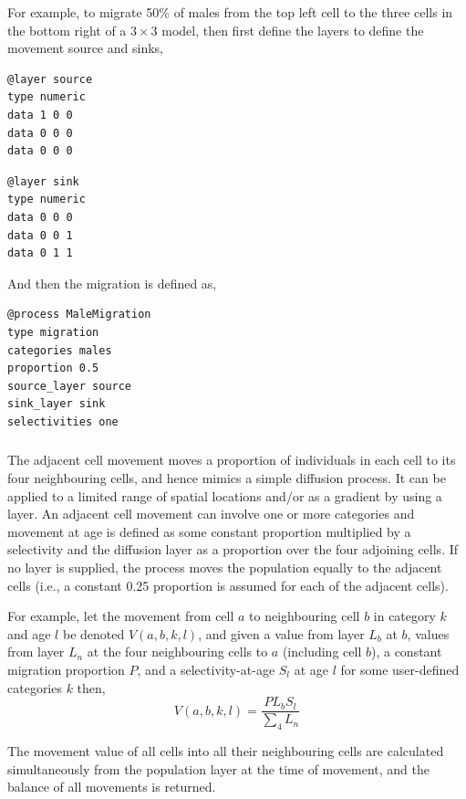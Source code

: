 For example, to migrate 50\% of males from the top left cell to the three cells in the bottom right of a $3\times3$ model, then first define the layers to define the movement source and sinks, 

{\small{\begin{verbatim}
@layer source
type numeric
data 1 0 0
data 0 0 0
data 0 0 0
\end{verbatim}}}

{\small{\begin{verbatim}
@layer sink
type numeric
data 0 0 0
data 0 0 1
data 0 1 1
\end{verbatim}}}

And then the migration is defined as,

{\small{\begin{verbatim}
@process MaleMigration
type migration
categories males
proportion 0.5
source_layer source
sink_layer sink
selectivities one
\end{verbatim}}}

\subsubsection{}

The adjacent cell movement moves a proportion of individuals in each cell to its four neighbouring cells, and hence mimics a simple diffusion process. It can be applied to a limited range of spatial locations and/or as a gradient by using a layer. An adjacent cell movement can involve one or more categories and movement at age is defined as some constant proportion multiplied by a selectivity and the diffusion layer as a proportion over the four adjoining cells. If no layer is supplied, the process moves the population equally to the adjacent cells (i.e., a constant 0.25 proportion is assumed for each of the adjacent cells).

For example, let the movement from cell $a$ to neighbouring cell $b$ in category $k$ and age $l$ be denoted $V(a,b,k,l)$, and given a value from layer $L_b$  at $b$, values from layer $L_n$ at the four neighbouring cells to $a$ (including cell $b$), a constant migration proportion $P$, and a selectivity-at-age $S_l$ at age $l$ for some user-defined categories $k$ then, 
\begin{equation}
  V(a,b,k,l) = \frac{P L_b S_l }{\sum\limits_4 L_n}
\end{equation}

The movement value of all cells into all their neighbouring cells are calculated simultaneously from the population layer at the time of movement, and the balance of all movements is returned.

